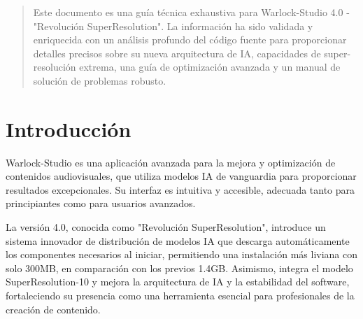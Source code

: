 \documentclass[11pt, a4paper]{article}
\begin{document}
\pagestyle{fancy} %

\begin{abstract}
\noindent %
Este documento es una guía técnica exhaustiva para Warlock-Studio 4.0 - "Revolución SuperResolution". La información ha sido validada y enriquecida con un análisis profundo del código fuente para proporcionar detalles precisos sobre su nueva arquitectura de IA, capacidades de super-resolución extrema, una guía de optimización avanzada y un manual de solución de problemas robusto.
\end{abstract}

\newpage %
\tableofcontents %
\newpage %



\section{Introducción}
Warlock-Studio es una aplicación avanzada para la mejora y optimización de contenidos audiovisuales, que utiliza modelos IA de vanguardia para proporcionar resultados excepcionales. Su interfaz es intuitiva y accesible, adecuada tanto para principiantes como para usuarios avanzados.

La versión 4.0, conocida como "Revolución SuperResolution", introduce un sistema innovador de distribución de modelos IA que descarga automáticamente los componentes necesarios al iniciar, permitiendo una instalación más liviana con solo 300MB, en comparación con los previos 1.4GB. Asimismo, integra el modelo SuperResolution-10 y mejora la arquitectura de IA y la estabilidad del software, fortaleciendo su presencia como una herramienta esencial para profesionales de la creación de contenido.
\end{document}
